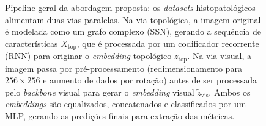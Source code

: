 \begin{figure}[!hbtp]
{%
    }
    \caption{Pipeline geral da abordagem proposta: os \textit{datasets} histopatológicos alimentam duas vias paralelas. Na via topológica, a imagem original é modelada como um grafo complexo (SSN), gerando a sequência de características $X_{\mathrm{top}}$, que é processada por um codificador recorrente (RNN) para originar o \textit{embedding} topológico $z_{\mathrm{top}}$. Na via visual, a imagem passa por pré-processamento (redimensionamento para $256\times256$ e aumento de dados por rotação) antes de ser processada pelo \textit{backbone} visual para gerar o \textit{embedding} visual $\tilde{z}_{\mathrm{vis}}$. Ambos os \textit{embeddings} são equalizados, concatenados e classificados por um MLP, gerando as predições finais para extração das métricas.}
    \label{fig:pipeline-geral}
    \label{fig:pipeline_tcc}
\end{figure}
